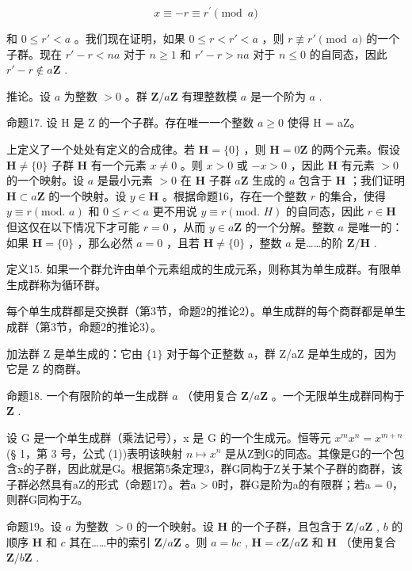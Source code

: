\[
x \equiv - r \equiv r ^ {\prime} \pmod {a}
\]

和 \(0 \leqslant r' < a\) 。我们现在证明，如果 \(0 \leqslant r < r' < a\) ，则 \(r \not\equiv r' \pmod{a}\) 的一个子群。现在 \(r' - r < na\) 对于 \(n \geqslant 1\) 和 \(r' - r > na\) 对于 \(n \leqslant 0\) 的自同态，因此 \(r' - r \notin a\mathbf{Z}\) .

推论。设 \(a\) 为整数 \(> 0\) 。群 \(\mathbf{Z} / a\mathbf{Z}\) 有理整数模 \(a\) 是一个阶为 \(a\) .

命题17. 设 H 是 Z 的一个子群。存在唯一一个整数 \(a \geqslant 0\) 使得 H = aZ。

上定义了一个处处有定义的合成律。若 \(\mathbf{H} = \{0\}\) ，则 \(\mathbf{H} = 0\mathbf{Z}\) 的两个元素。假设 \(\mathbf{H} \neq \{0\}\) 子群 \(\mathbf{H}\) 有一个元素 \(x \neq 0\) 。则 \(x > 0\) 或 \(-x > 0\) ，因此 \(\mathbf{H}\) 有元素 \(>0\) 的一个映射。设 \(a\) 是最小元素 \(>0\) 在 \(\mathbf{H}\) 子群 \(a\mathbf{Z}\) 生成的 \(a\) 包含于 \(\mathbf{H}\) ；我们证明 \(\mathbf{H} \subset a\mathbf{Z}\) 的一个映射。设 \(y \in \mathbf{H}\) 。根据命题16，存在一个整数 \(r\) 的集合，使得 \(y \equiv r (\text{mod. } a)\) 和 \(0 \leqslant r < a\) 更不用说 \(y \equiv r (\text{mod. } H)\) 的自同态，因此 \(r \in \mathbf{H}\) 但这仅在以下情况下才可能 \(r = 0\) ，从而 \(y \in a\mathbf{Z}\) 的一个分解。整数 \(a\) 是唯一的：如果 \(\mathbf{H} = \{0\}\) ，那么必然 \(a = 0\) ，且若 \(\mathbf{H} \neq \{0\}\) ，整数 \(a\) 是……的阶 \(\mathbf{Z}/\mathbf{H}\) .

定义15. 如果一个群允许由单个元素组成的生成元系，则称其为单生成群。有限单生成群称为循环群。

每个单生成群都是交换群（第3节，命题2的推论2）。单生成群的每个商群都是单生成群（第3节，命题2的推论3）。

加法群 Z 是单生成的：它由 \(\{1\}\) 对于每个正整数 a，群 Z/aZ 是单生成的，因为它是 Z 的商群。

命题18. 一个有限阶的单一生成群 \(a\) （使用复合 \(\mathbf{Z}/a\mathbf{Z}\) 。一个无限单生成群同构于 \(\mathbf{Z}\) .

设 G 是一个单生成群（乘法记号），x 是 G 的一个生成元。恒等元 \(x^{m}x^{n} = x^{m+n}\) (§ 1，第 3 号，公式 (1))表明该映射 \(n \mapsto x^{n}\) 是从Z到G的同态。其像是G的一个包含x的子群，因此就是G。根据第5条定理3，群G同构于Z关于某个子群的商群，该子群必然具有aZ的形式（命题17）。若a \textgreater{} 0时，群G是阶为a的有限群；若a = 0，则群G同构于Z。

命题19。设 \(a\) 为整数 \(>0\) 的一个映射。设 \(\mathbf{H}\) 的一个子群，且包含于 \(\mathbf{Z}/a\mathbf{Z}\) , \(b\) 的顺序 \(\mathbf{H}\) 和 \(c\) 其在……中的索引 \(\mathbf{Z}/a\mathbf{Z}\) 。则 \(a = bc\) , \(\mathbf{H} = c\mathbf{Z}/a\mathbf{Z}\) 和 \(\mathbf{H}\) （使用复合 \(\mathbf{Z}/b\mathbf{Z}\) .

